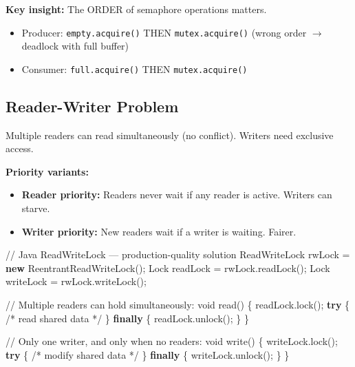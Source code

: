 \documentclass[11pt]{article}
\providecommand{\tightlist}{\setlength{\itemsep}{1pt}\setlength{\parskip}{0pt}}
\newenvironment{Shaded}{\begin{snugshade}}{\end{snugshade}}
\newcommand{\BuiltInTok}[1]{\textcolor[rgb]{0.50,0.55,0.55}{#1}}
\newcommand{\CommentTok}[1]{\textcolor[rgb]{0.48,0.49,0.49}{#1}}
\newcommand{\ControlFlowTok}[1]{\textcolor[rgb]{0.99,0.74,0.29}{\textbf{#1}}}
\newcommand{\DataTypeTok}[1]{\textcolor[rgb]{0.16,0.50,0.73}{#1}}
\newcommand{\FunctionTok}[1]{\textcolor[rgb]{0.56,0.27,0.68}{#1}}
\newcommand{\KeywordTok}[1]{\textcolor[rgb]{0.81,0.81,0.76}{\textbf{#1}}}
\newcommand{\NormalTok}[1]{\textcolor[rgb]{0.81,0.81,0.76}{#1}}
\newcommand{\OperatorTok}[1]{\textcolor[rgb]{0.81,0.81,0.76}{#1}}
\begin{document}
\textbf{Key insight:} The ORDER of semaphore operations matters.

\begin{itemize}
\tightlist
\item
  Producer: \texttt{empty.acquire()} THEN \texttt{mutex.acquire()} (wrong order \(\rightarrow\) deadlock with full buffer)
\item
  Consumer: \texttt{full.acquire()} THEN \texttt{mutex.acquire()}
\end{itemize}

\subsection{Reader-Writer Problem}\label{reader-writer-problem}

Multiple readers can read simultaneously (no conflict). Writers need exclusive access.

\textbf{Priority variants:}

\begin{itemize}
\tightlist
\item
  \textbf{Reader priority:} Readers never wait if any reader is active. Writers can starve.
\item
  \textbf{Writer priority:} New readers wait if a writer is waiting. Fairer.
\end{itemize}


\begin{Shaded}
\begin{Highlighting}[]
\CommentTok{// Java ReadWriteLock — production{-}quality solution}
\BuiltInTok{ReadWriteLock}\NormalTok{ rwLock }\OperatorTok{=} \KeywordTok{new} \BuiltInTok{ReentrantReadWriteLock}\OperatorTok{();}
\BuiltInTok{Lock}\NormalTok{ readLock  }\OperatorTok{=}\NormalTok{ rwLock}\OperatorTok{.}\FunctionTok{readLock}\OperatorTok{();}
\BuiltInTok{Lock}\NormalTok{ writeLock }\OperatorTok{=}\NormalTok{ rwLock}\OperatorTok{.}\FunctionTok{writeLock}\OperatorTok{();}

\CommentTok{// Multiple readers can hold simultaneously:}
\DataTypeTok{void} \FunctionTok{read}\OperatorTok{()} \OperatorTok{\{}
\NormalTok{    readLock}\OperatorTok{.}\FunctionTok{lock}\OperatorTok{();}
    \ControlFlowTok{try} \OperatorTok{\{} \CommentTok{/* read shared data */} \OperatorTok{\}}
    \ControlFlowTok{finally} \OperatorTok{\{}\NormalTok{ readLock}\OperatorTok{.}\FunctionTok{unlock}\OperatorTok{();} \OperatorTok{\}}
\OperatorTok{\}}

\CommentTok{// Only one writer, and only when no readers:}
\DataTypeTok{void} \FunctionTok{write}\OperatorTok{()} \OperatorTok{\{}
\NormalTok{    writeLock}\OperatorTok{.}\FunctionTok{lock}\OperatorTok{();}
    \ControlFlowTok{try} \OperatorTok{\{} \CommentTok{/* modify shared data */} \OperatorTok{\}}
    \ControlFlowTok{finally} \OperatorTok{\{}\NormalTok{ writeLock}\OperatorTok{.}\FunctionTok{unlock}\OperatorTok{();} \OperatorTok{\}}
\OperatorTok{\}}
\end{Highlighting}
\end{Shaded}
\end{document}

